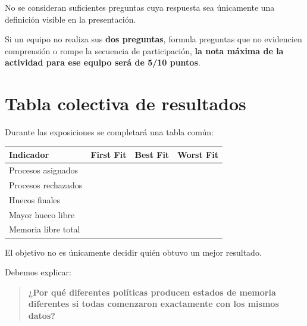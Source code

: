 \documentclass[
  spanish,
  letterpaper,
]{scrbook}
\newcounter{none} %
\begin{document}
No se consideran suficientes preguntas cuya respuesta sea únicamente una
definición visible en la presentación.

\begin{tcolorbox}[enhanced jigsaw, arc=.35mm, bottomrule=.15mm, bottomtitle=1mm, breakable, colback=white, colbacktitle=quarto-callout-warning-color!10!white, colframe=quarto-callout-warning-color-frame, coltitle=black, left=2mm, leftrule=.75mm, opacityback=0, opacitybacktitle=0.6, rightrule=.15mm, title=\textcolor{quarto-callout-warning-color}{\faExclamationTriangle}\hspace{0.5em}{La cadena debe completarse al 100 \%}, titlerule=0mm, toprule=.15mm, toptitle=1mm]

Si un equipo no realiza sus \textbf{dos preguntas}, formula preguntas
que no evidencien comprensión o rompe la secuencia de participación,
\textbf{la nota máxima de la actividad para ese equipo será de 5/10
puntos}.

\end{tcolorbox}


\chapter{Tabla colectiva de
resultados}\label{tabla-colectiva-de-resultados}

Durante las exposiciones se completará una tabla común:

{\def\LTcaptype{none} %
\begin{longtable}[]{@{}lrrr@{}}
\toprule\noalign{}
Indicador & First Fit & Best Fit & Worst Fit \\
\midrule\noalign{}
\endhead
\bottomrule\noalign{}
\endlastfoot
Procesos asignados & & & \\
Procesos rechazados & & & \\
Huecos finales & & & \\
Mayor hueco libre & & & \\
Memoria libre total & & & \\
\end{longtable}
}

El objetivo no es únicamente decidir quién obtuvo un mejor resultado.

Debemos explicar:

\begin{quote}
\textbf{¿Por qué diferentes políticas producen estados de memoria
diferentes si todas comenzaron exactamente con los mismos datos?}
\end{quote}
\end{document}
